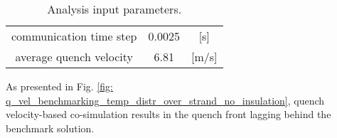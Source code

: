 \begin{table}[H]
    \caption{Analysis input parameters.} 
    \vspace{-1.em} 
    \fontsize{10}{10}
    \selectfont 
    \renewcommand{\arraystretch}{1.5}
    \begin{center}
        \begin{tabular}{ ccc }  
        \hline
        communication time step & 0.0025 & [s] \\
        average quench velocity & 6.81 & [m/s] \\
        \hline 
        \end{tabular}
    \end{center}  
     \label{table: 1d_qv_benchmarking_geometry_parameters_quench_velocity} 
 \end{table}

As presented in Fig. \ref{fig: q_vel_benchmarking_temp_distr_over_strand_no_insulation}, quench velocity-based co-simulation results in the quench front lagging behind the benchmark solution. 

